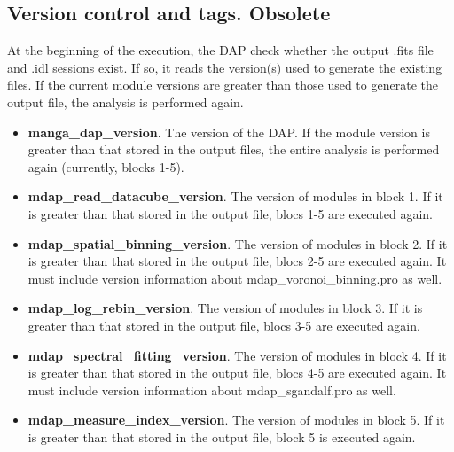 \documentclass[11pt]{book}
\begin{document}




\subsection{Version control and tags. Obsolete}
\label{dap_sec:dap_version}


At the beginning of the execution, the DAP check whether the output
.fits file and .idl sessions exist. If so, it reads the version(s)
used to generate the existing files. If the current module versions
are greater than those used to generate the output file, the analysis
is performed again.

\begin{itemize}

\item {\bf manga\_dap\_version}. The version of the DAP. If the module
  version is greater than that stored in the output files, the entire
  analysis is performed again (currently, blocks 1-5).

\item {\bf mdap\_read\_datacube\_version}. The version of modules in
  block 1. If it is greater than that stored in the output file, blocs
  1-5 are executed again.

\item {\bf mdap\_spatial\_binning\_version}. The version of modules in
  block 2. If it is greater than that stored in the output file, blocs
  2-5 are executed again. It must include version information about
  mdap\_voronoi\_binning.pro as well.

\item {\bf mdap\_log\_rebin\_version}. The version of modules in
  block 3. If it is greater than that stored in the output file, blocs
  3-5 are executed again.

\item {\bf mdap\_spectral\_fitting\_version}. The version of modules
  in block 4. If it is greater than that stored in the output file,
  blocs 4-5 are executed again. It must include version information
  about mdap\_sgandalf.pro as well.

\item {\bf mdap\_measure\_index\_version}. The version of modules in
  block 5. If it is greater than that stored in the output file, block
  5 is executed again.

\end{itemize}
\end{document}
